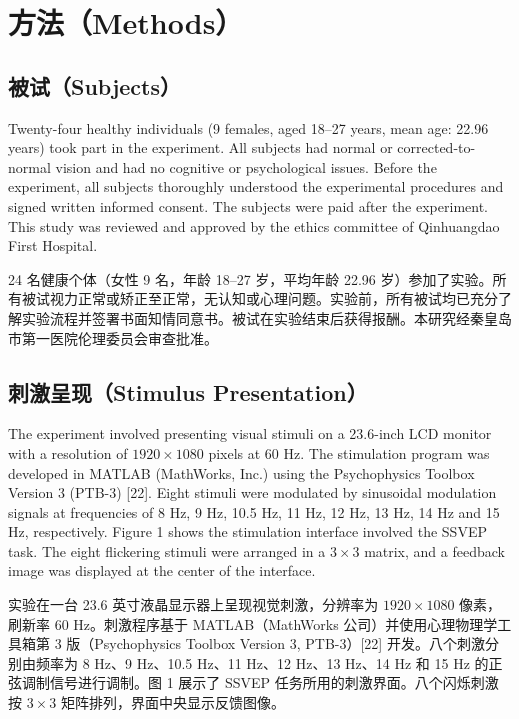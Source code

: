 \documentclass[11pt]{ctexart}
\newenvironment{en}{\begin{enbox}\color{black!85}}{\end{enbox}}
\newenvironment{zh}{\begin{zhbox}}{\end{zhbox}}
\begin{document}
\section{方法（Methods）}

\subsection{被试（Subjects）}
\begin{en}
Twenty-four healthy individuals (9 females, aged 18--27 years, mean age: 22.96 years) took part in the experiment. All subjects had normal or corrected-to-normal vision and had no cognitive or psychological issues. Before the experiment, all subjects thoroughly understood the experimental procedures and signed written informed consent. The subjects were paid after the experiment. This study was reviewed and approved by the ethics committee of Qinhuangdao First Hospital.
\end{en}
\begin{zh}
24 名健康个体（女性 9 名，年龄 18--27 岁，平均年龄 22.96 岁）参加了实验。所有被试视力正常或矫正至正常，无认知或心理问题。实验前，所有被试均已充分了解实验流程并签署书面知情同意书。被试在实验结束后获得报酬。本研究经秦皇岛市第一医院伦理委员会审查批准。
\end{zh}

\subsection{刺激呈现（Stimulus Presentation）}
\begin{en}
The experiment involved presenting visual stimuli on a 23.6-inch LCD monitor with a resolution of $1920\times1080$ pixels at 60 Hz. The stimulation program was developed in MATLAB (MathWorks, Inc.) using the Psychophysics Toolbox Version 3 (PTB-3) [22]. Eight stimuli were modulated by sinusoidal modulation signals at frequencies of 8 Hz, 9 Hz, 10.5 Hz, 11 Hz, 12 Hz, 13 Hz, 14 Hz and 15 Hz, respectively. Figure 1 shows the stimulation interface involved the SSVEP task. The eight flickering stimuli were arranged in a $3\times3$ matrix, and a feedback image was displayed at the center of the interface.
\end{en}
\begin{zh}
实验在一台 23.6 英寸液晶显示器上呈现视觉刺激，分辨率为 $1920\times1080$ 像素，刷新率 60 Hz。刺激程序基于 MATLAB（MathWorks 公司）并使用心理物理学工具箱第 3 版（Psychophysics Toolbox Version 3, PTB-3）[22] 开发。八个刺激分别由频率为 8 Hz、9 Hz、10.5 Hz、11 Hz、12 Hz、13 Hz、14 Hz 和 15 Hz 的正弦调制信号进行调制。图 1 展示了 SSVEP 任务所用的刺激界面。八个闪烁刺激按 $3\times3$ 矩阵排列，界面中央显示反馈图像。
\end{zh}
\end{document}
